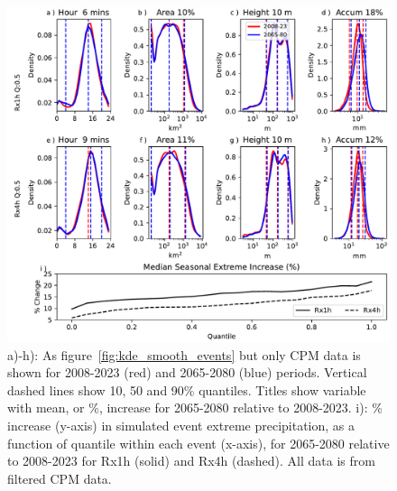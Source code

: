 \documentclass[11pt,a4paper]{article}
\begin{document}
\begin{figure}[h!]
	\centering
	\includegraphics[width=\linewidth]{kde_smooth_events_2065_2080}
	\caption{a)-h): As figure~\ref{fig:kde_smooth_events} but only CPM data is shown for 2008-2023 (red) and 2065-2080 (blue) periods. Vertical dashed lines show 10, 50 and 90\% quantiles. Titles show variable with mean, or \%, increase for 2065-2080 relative to 2008-2023. i): \% increase (y-axis) in simulated event extreme precipitation, as a function of quantile within each event (x-axis), for 2065-2080 relative to 2008-2023 for Rx1h (solid) and Rx4h (dashed). All data is from filtered CPM data. }
	\label{fig:kde_smooth_events_2065_2080}
\end{figure}
\end{document}
